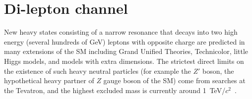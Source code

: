 \documentclass{cimento}
\begin{document}
%
%
\section{Di-lepton channel} \label{dilepton}
%
New heavy states consisting of a narrow resonance that decays 
into two high energy (several hundreds of GeV) 
leptons with opposite charge are predicted in  
many extensions of the 
SM %
including Grand Unified Theories, 
Technicolor, little Higgs models, and models 
with extra dimensions. 
The strictest direct limits on the existence of such 
heavy neutral particles (for example the $Z'$ boson, the hypothetical 
heavy partner of $Z$ gauge boson of the SM) come from searches 
at the Tevatron, and the highest excluded mass is currently around 
1~TeV/$c^2$~\cite{Aaltonen:2008vx}.
\end{document}
